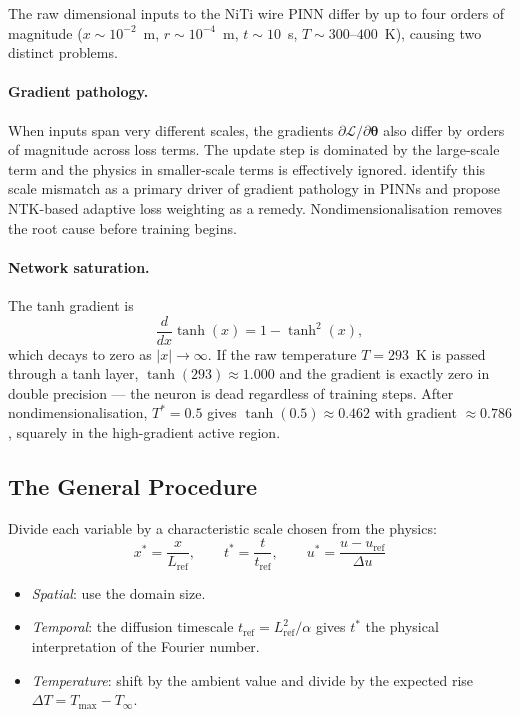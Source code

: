 \documentclass[12pt, a4paper]{article}
\begin{document}
The raw dimensional inputs to the NiTi wire PINN differ by up to four orders of
magnitude ($x \sim 10^{-2}$~m, $r \sim 10^{-4}$~m, $t \sim 10$~s,
$T \sim 300$--$400$~K), causing two distinct problems.

\paragraph{Gradient pathology.}
When inputs span very different scales, the gradients $\partial\mathcal{L}/\partial\bm{\theta}$ also differ by orders of magnitude across loss terms. The update
step is dominated by the large-scale term and the physics in smaller-scale terms
is effectively ignored. \citet{wang2021} identify this scale mismatch as a primary
driver of gradient pathology in PINNs and propose NTK-based adaptive loss
weighting as a remedy. Nondimensionalisation removes the root cause before training
begins.

\paragraph{Network saturation.}
The tanh gradient is
\begin{equation}
    \frac{d}{dx}\tanh(x) = 1 - \tanh^2(x),
    \label{eq:tanh_deriv}
\end{equation}
which decays to zero as $|x| \to \infty$. If the raw temperature $T = 293$~K
is passed through a tanh layer, $\tanh(293) \approx 1.000$ and the gradient is
exactly zero in double precision — the neuron is dead regardless of training
steps. After nondimensionalisation, $T^* = 0.5$ gives $\tanh(0.5) \approx 0.462$
with gradient $\approx 0.786$, squarely in the high-gradient active region.

\subsection{The General Procedure}
\label{sec:nondim_proc}

Divide each variable by a characteristic scale chosen from the physics:
\begin{equation}
    x^* = \frac{x}{L_\mathrm{ref}}, \qquad
    t^* = \frac{t}{t_\mathrm{ref}}, \qquad
    u^* = \frac{u - u_\mathrm{ref}}{\Delta u}
    \label{eq:nondim_generic}
\end{equation}

\begin{itemize}[noitemsep]
    \item \emph{Spatial}: use the domain size.
    \item \emph{Temporal}: the diffusion timescale $t_\mathrm{ref} = L_\mathrm{ref}^2/\alpha$
    gives $t^*$ the physical interpretation of the Fourier number.
    \item \emph{Temperature}: shift by the ambient value and divide by the
    expected rise $\Delta T = T_\mathrm{max} - T_\infty$.
\end{itemize}
\end{document}
